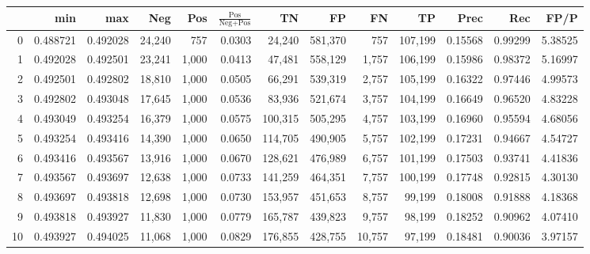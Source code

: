 \begin{tabular}{rrrrrrrrrrrrr}
\toprule
{} &       min &       max &     Neg &    Pos & $\frac{\text{Pos}}{\text{Neg}+\text{Pos}}$ &       TN &       FP &       FN &       TP &     Prec &      Rec &     FP/P \\
\midrule
0   &  0.488721 &  0.492028 &  24,240 &    757 &                                     0.0303 &   24,240 &  581,370 &      757 &  107,199 &  0.15568 &  0.99299 &  5.38525 \\
1   &  0.492028 &  0.492501 &  23,241 &  1,000 &                                     0.0413 &   47,481 &  558,129 &    1,757 &  106,199 &  0.15986 &  0.98372 &  5.16997 \\
2   &  0.492501 &  0.492802 &  18,810 &  1,000 &                                     0.0505 &   66,291 &  539,319 &    2,757 &  105,199 &  0.16322 &  0.97446 &  4.99573 \\
3   &  0.492802 &  0.493048 &  17,645 &  1,000 &                                     0.0536 &   83,936 &  521,674 &    3,757 &  104,199 &  0.16649 &  0.96520 &  4.83228 \\
4   &  0.493049 &  0.493254 &  16,379 &  1,000 &                                     0.0575 &  100,315 &  505,295 &    4,757 &  103,199 &  0.16960 &  0.95594 &  4.68056 \\
5   &  0.493254 &  0.493416 &  14,390 &  1,000 &                                     0.0650 &  114,705 &  490,905 &    5,757 &  102,199 &  0.17231 &  0.94667 &  4.54727 \\
6   &  0.493416 &  0.493567 &  13,916 &  1,000 &                                     0.0670 &  128,621 &  476,989 &    6,757 &  101,199 &  0.17503 &  0.93741 &  4.41836 \\
7   &  0.493567 &  0.493697 &  12,638 &  1,000 &                                     0.0733 &  141,259 &  464,351 &    7,757 &  100,199 &  0.17748 &  0.92815 &  4.30130 \\
8   &  0.493697 &  0.493818 &  12,698 &  1,000 &                                     0.0730 &  153,957 &  451,653 &    8,757 &   99,199 &  0.18008 &  0.91888 &  4.18368 \\
9   &  0.493818 &  0.493927 &  11,830 &  1,000 &                                     0.0779 &  165,787 &  439,823 &    9,757 &   98,199 &  0.18252 &  0.90962 &  4.07410 \\
10  &  0.493927 &  0.494025 &  11,068 &  1,000 &                                     0.0829 &  176,855 &  428,755 &   10,757 &   97,199 &  0.18481 &  0.90036 &  3.97157 \\

\end{tabular}
